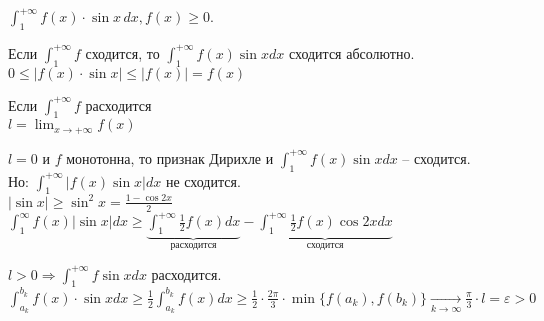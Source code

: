 \begin{Example}
	\begin{MyList}
		\item $\displaystyle \int_{1}^{+\infty} f(x) \cdot \sin x \, dx, f(x) \geqslant 0$.\\
		\begin{MyItemize}
			\item Если $\displaystyle \int_{1}^{+\infty} f$ сходится, то $\displaystyle \int_{1}^{+\infty} f(x) \sin x dx$ сходится абсолютно.\\
			$0 \leqslant |f(x) \cdot \sin x| \leqslant |f(x)| = f(x)$\\
			\item Если $\displaystyle \int_{1}^{+\infty} f$ расходится\\
			$\displaystyle l = \lim_{x \to + \infty} f(x)$

			\begin{MyList}
				\item $l = 0$ и $f$ монотонна, то признак Дирихле и $\displaystyle \int_{1}^{+\infty} f(x) \sin x dx$ -- сходится.\\
				Но: $\displaystyle \int_{1}^{+\infty} |f(x) \sin x| dx$ не сходится.\\
				$\displaystyle |\sin x| \geqslant \sin^2 x = \frac{1 - \cos 2x}{2}$\\
				$\displaystyle \int_{1}^{\infty} f(x) |\sin x| dx \geqslant \underbrace{\int_{1}^{+\infty} \frac{1}{2}f(x)dx}_{\text{расходится}} - 
				\underbrace{\int_{1}^{+\infty} \frac{1}{2} f(x) \cos 2x dx}_{\text{сходится}}$
				\item $\displaystyle l > 0 \Rightarrow \int_{1}^{+ \infty} f \sin x dx$ расходится.\\
				$\displaystyle \int_{a_k}^{b_k} f(x) \cdot \sin x dx \geqslant \frac{1}{2} \int_{a_k}^{b_k}
				f(x)dx \geqslant \frac{1}{2} \cdot \frac{2 \pi}{3} \cdot \min\{f(a_k), f(b_k)\} 
				\underset{k \to \infty}{\to} \frac{\pi}{3} \cdot l = \varepsilon > 0$
			\end{MyList}
		\end{MyItemize}
		

\end{MyList}
\end{Example}
